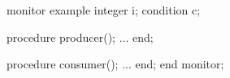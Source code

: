 \documentclass[varwidth=12.5em,crop]{standalone}
\begin{document}
\begin{pascalcode}
monitor example
  integer i;
  condition c;

  procedure producer();
  ...
  end;

  procedure consumer();
  ...
  end;
end monitor;  
\end{pascalcode}
\end{document}
